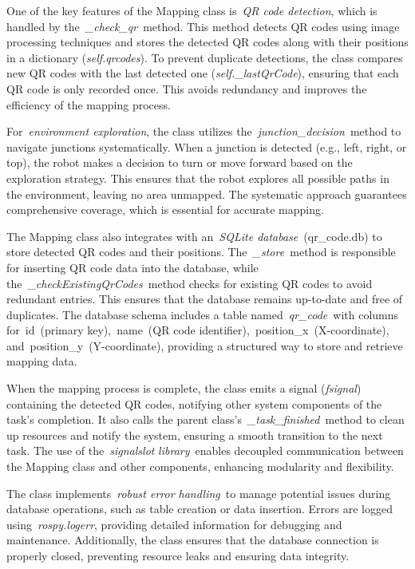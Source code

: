 \documentclass[../../main]{subfiles}
\begin{document}
One of the key features of the Mapping class is~\emph{QR code
detection}, which is handled by the~\emph{\_check\_qr}~method. This
method detects QR codes using image processing techniques and stores the
detected QR codes along with their positions in a dictionary
(\emph{self.qrcodes}). To prevent duplicate detections, the class
compares new QR codes with the last detected one
(\emph{self.\_lastQrCode}), ensuring that each QR code is only recorded
once. This avoids redundancy and improves the efficiency of the mapping
process.

For~\emph{environment exploration}, the class utilizes
the~\emph{junction\_decision}~method to navigate junctions
systematically. When a junction is detected (e.g., left, right, or top),
the robot makes a decision to turn or move forward based on the
exploration strategy. This ensures that the robot explores all possible
paths in the environment, leaving no area unmapped. The systematic
approach guarantees comprehensive coverage, which is essential for
accurate mapping.

The Mapping class also integrates with an~\emph{SQLite
database}~(qr\_code.db) to store detected QR codes and their positions.
The~\emph{\_store~}method is responsible for inserting QR code data into
the database, while the~\emph{\_checkExistingQrCodes}~method checks for
existing QR codes to avoid redundant entries. This ensures that the
database remains up-to-date and free of duplicates. The database schema
includes a table named~\emph{qr\_code}~with columns for~id~(primary
key),~name~(QR code identifier),~position\_x~(X-coordinate),
and~position\_y~(Y-coordinate), providing a structured way to store and
retrieve mapping data.

When the mapping process is complete, the class emits a signal
(\emph{fsignal}) containing the detected QR codes, notifying other
system components of the task's completion. It also calls the parent
class's~\emph{\_task\_finished}~method to clean up resources and notify
the system, ensuring a smooth transition to the next task. The use of
the~\emph{signalslot} \emph{library}~enables decoupled communication
between the Mapping class and other components, enhancing modularity and
flexibility.

The class implements~\emph{robust error handling}~to manage potential
issues during database operations, such as table creation or data
insertion. Errors are logged using~\emph{rospy.logerr}, providing
detailed information for debugging and maintenance. Additionally, the
class ensures that the database connection is properly closed,
preventing resource leaks and ensuring data integrity.
\end{document}
